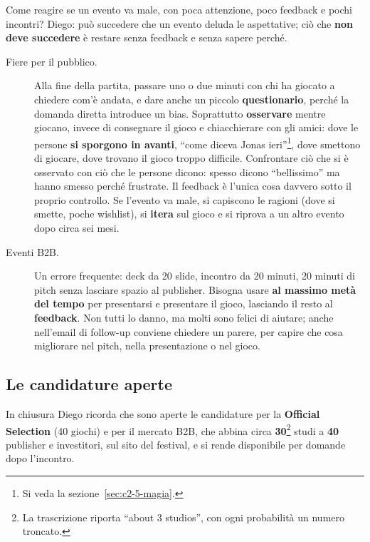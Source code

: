 Come reagire se un evento va male, con poca attenzione, poco feedback e pochi
incontri? Diego: può succedere che un evento deluda le aspettative; ciò che
\textbf{non deve succedere} è restare senza feedback e senza sapere perché.
\begin{description}
  \item[Fiere per il pubblico.] Alla fine della partita, passare uno o due minuti
        con chi ha giocato a chiedere com'è andata, e dare anche un piccolo
        \textbf{questionario}, perché la domanda diretta introduce un bias.
        Soprattutto \textbf{osservare} mentre giocano, invece di consegnare il
        gioco e chiacchierare con gli amici: dove le persone \textbf{si sporgono in
        avanti}, ``come diceva Jonas ieri''\footnote{Si veda la
        sezione~\ref{sec:c2-5-magia}.}, dove smettono di giocare, dove trovano il
        gioco troppo difficile. Confrontare ciò che si è osservato con ciò che le
        persone dicono: spesso dicono ``bellissimo'' ma hanno smesso perché
        frustrate. Il feedback è l'unica cosa davvero sotto il proprio controllo. Se
        l'evento va male, si capiscono le ragioni (dove si smette, poche wishlist),
        si \textbf{itera} sul gioco e si riprova a un altro evento dopo circa sei
        mesi.
  \item[Eventi B2B.] Un errore frequente: deck da 20 slide, incontro da 20
        minuti, 20 minuti di pitch senza lasciare spazio al publisher. Bisogna usare
        \textbf{al massimo metà del tempo} per presentarsi e presentare il gioco,
        lasciando il resto al \textbf{feedback}. Non tutti lo danno, ma molti sono
        felici di aiutare; anche nell'email di follow-up conviene chiedere un
        parere, per capire che cosa migliorare nel pitch, nella presentazione o nel
        gioco.
\end{description}

\subsection{Le candidature aperte}

In chiusura Diego ricorda che sono aperte le candidature per la \textbf{Official
Selection} (40 giochi) e per il mercato B2B, che abbina circa
\textbf{30}\footnote{La trascrizione riporta ``about 3 studios'', con ogni
probabilità un numero troncato.} studi a \textbf{40} publisher e investitori, sul
sito del festival, e si rende disponibile per domande dopo l'incontro.

